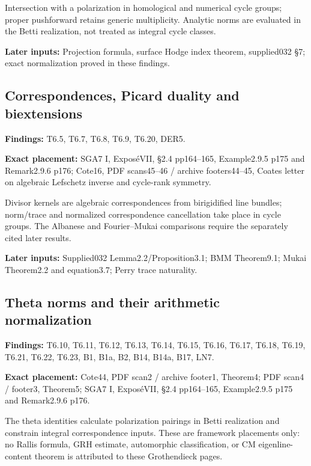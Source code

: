 \documentclass[11pt,a4paper]{article}
\theoremstyle{definition}
\begin{document}
Intersection with a polarization in homological and numerical cycle
groups; proper pushforward retains generic multiplicity. Analytic norms
are evaluated in the Betti realization, not treated as integral cycle
classes.

\textbf{Later inputs:} Projection formula, surface Hodge index theorem,
supplied032 §7; exact normalization proved in these findings.

\subsection{Correspondences, Picard duality and
biextensions}\label{FRAMEWORK-correspondences-picard-duality-and-biextensions}

\textbf{Findings:} T6.5, T6.7, T6.8, T6.9, T6.20, DER5.

\textbf{Exact placement:} SGA7 I, ExposéVII, §2.4 pp164--165,
Example2.9.5 p175 and Remark2.9.6 p176; Cote16, PDF scans45--46 /
archive footers44--45, Coates letter on algebraic Lefschetz inverse and
cycle-rank symmetry.

Divisor kernels are algebraic correspondences from birigidified line
bundles; norm/trace and normalized correspondence cancellation take
place in cycle groups. The Albanese and Fourier--Mukai comparisons
require the separately cited later results.

\textbf{Later inputs:} Supplied032 Lemma2.2/Proposition3.1; BMM
Theorem9.1; Mukai Theorem2.2 and equation3.7; Perry trace naturality.

\subsection{Theta norms and their arithmetic
normalization}\label{FRAMEWORK-theta-norms-and-their-arithmetic-normalization}

\textbf{Findings:} T6.10, T6.11, T6.12, T6.13, T6.14, T6.15, T6.16,
T6.17, T6.18, T6.19, T6.21, T6.22, T6.23, B1, B1a, B2, B14, B14a, B17,
LN7.

\textbf{Exact placement:} Cote44, PDF scan2 / archive footer1, Theorem4;
PDF scan4 / footer3, Theorem5; SGA7 I, ExposéVII, §2.4 pp164--165,
Example2.9.5 p175 and Remark2.9.6 p176.

The theta identities calculate polarization pairings in Betti
realization and constrain integral correspondence inputs. These are
framework placements only: no Rallis formula, GRH estimate, automorphic
classification, or CM eigenline-content theorem is attributed to these
Grothendieck pages.
\end{document}
